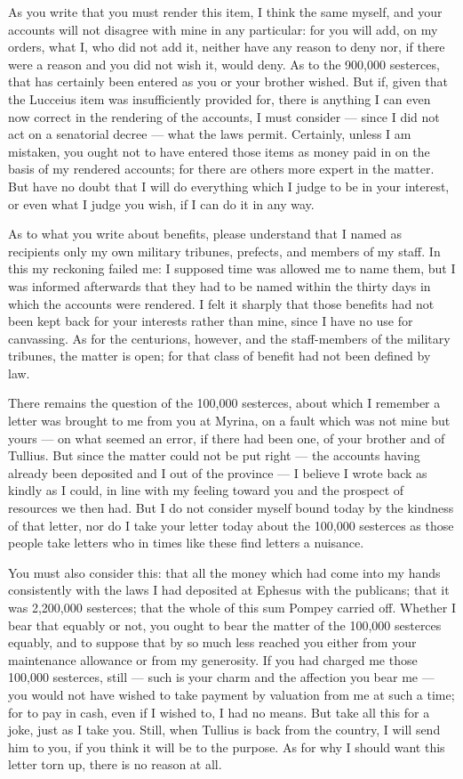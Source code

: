  As you write that you must render this item, I think the same myself, and your accounts will not disagree with mine in any particular: for you will add, on my orders, what I, who did not add it, neither have any reason to deny nor, if there were a reason and you did not wish it, would deny. As to the 900{,}000 sesterces, that has certainly been entered as you or your brother wished. But if, given that the Lucceius item was insufficiently provided for, there is anything I can even now correct in the rendering of the accounts, I must consider --- since I did not act on a senatorial decree --- what the laws permit. Certainly, unless I am mistaken, you ought not to have entered those items as money paid in on the basis of my rendered accounts; for there are others more expert in the matter. But have no doubt that I will do everything which I judge to be in your interest, or even what I judge you wish, if I can do it in any way.

 As to what you write about benefits, please understand that I named as recipients only my own military tribunes, prefects, and members of my staff. In this my reckoning failed me: I supposed time was allowed me to name them, but I was informed afterwards that they had to be named within the thirty days in which the accounts were rendered. I felt it sharply that those benefits had not been kept back for your interests rather than mine, since I have no use for canvassing. As for the centurions, however, and the staff-members of the military tribunes, the matter is open; for that class of benefit had not been defined by law.

 There remains the question of the 100{,}000 sesterces, about which I remember a letter was brought to me from you at Myrina, on a fault which was not mine but yours --- on what seemed an error, if there had been one, of your brother and of Tullius. But since the matter could not be put right --- the accounts having already been deposited and I out of the province --- I believe I wrote back as kindly as I could, in line with my feeling toward you and the prospect of resources we then had. But I do not consider myself bound today by the kindness of that letter, nor do I take your letter today about the 100{,}000 sesterces as those people take letters who in times like these find letters a nuisance.

 You must also consider this: that all the money which had come into my hands consistently with the laws I had deposited at Ephesus with the publicans; that it was 2{,}200{,}000 sesterces; that the whole of this sum Pompey carried off. Whether I bear that equably or not, you ought to bear the matter of the 100{,}000 sesterces equably, and to suppose that by so much less reached you either from your maintenance allowance or from my generosity. If you had charged me those 100{,}000 sesterces, still --- such is your charm and the affection you bear me --- you would not have wished to take payment by valuation from me at such a time; for to pay in cash, even if I wished to, I had no means. But take all this for a joke, just as I take you. Still, when Tullius is back from the country, I will send him to you, if you think it will be to the purpose. As for why I should want this letter torn up, there is no reason at all.
